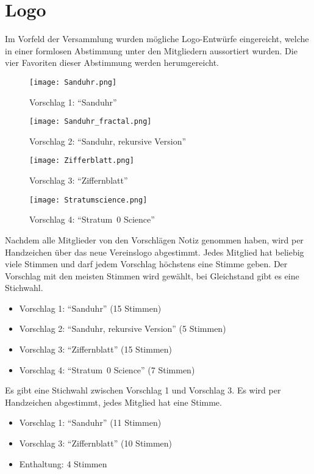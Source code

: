 \documentclass[a4paper,12pt]{scrartcl}
\begin{document}
\section{Logo}
Im Vorfeld der Versammlung wurden mögliche Logo-Entwürfe eingereicht, welche in
einer formlosen Abstimmung unter den Mitgliedern aussortiert wurden. Die vier
Favoriten dieser Abstimmung werden herumgereicht.

\begin{figure}[p]
  \centering
  \texttt{[image: Sanduhr.png]}
  \caption{Vorschlag 1: "`Sanduhr"'}
\end{figure}
\vspace{20pt}
\begin{figure}[p]
  \centering
  \texttt{[image: Sanduhr\_fractal.png]}
  \caption{Vorschlag 2: "`Sanduhr, rekursive Version"'}
\end{figure}
\vspace{20pt}
\begin{figure}[p]
  \centering
  \texttt{[image: Zifferblatt.png]}
  \caption{Vorschlag 3: "`Ziffernblatt"'}
\end{figure}
\vspace{20pt}
\begin{figure}[p]
  \centering
  \texttt{[image: Stratumscience.png]}
  \caption{Vorschlag 4: "`Stratum~0 Science"'}
\end{figure}

Nachdem alle Mitglieder von den Vorschlägen Notiz genommen haben, wird per
Handzeichen über das neue Vereinslogo abgestimmt. Jedes Mitglied hat beliebig
viele Stimmen und darf jedem Vorschlag höchstens eine Stimme geben. Der
Vorschlag mit den meisten Stimmen wird gewählt, bei Gleichstand gibt es eine
Stichwahl.

\begin{itemize}
  \item Vorschlag 1: "`Sanduhr"' (15 Stimmen)
  \item Vorschlag 2: "`Sanduhr, rekursive Version"' (5 Stimmen)
  \item Vorschlag 3: "`Ziffernblatt"' (15 Stimmen)
  \item Vorschlag 4: "`Stratum~0 Science"' (7 Stimmen)
\end{itemize}

Es gibt eine Stichwahl zwischen Vorschlag 1 und Vorschlag 3. Es wird per
Handzeichen abgestimmt, jedes Mitglied hat eine Stimme.
\begin{itemize}
  \item Vorschlag 1: "`Sanduhr"' (11 Stimmen)
  \item Vorschlag 3: "`Ziffernblatt"' (10 Stimmen)
  \item Enthaltung: 4 Stimmen
\end{itemize}
\end{document}
